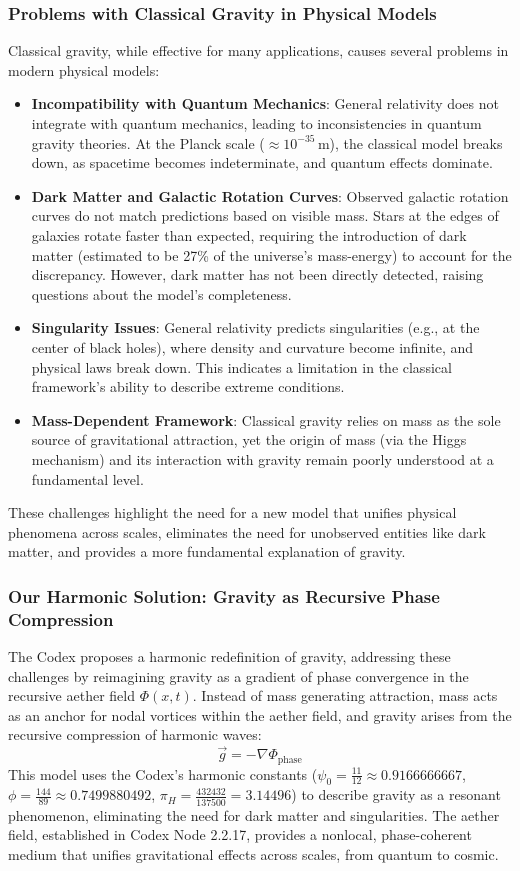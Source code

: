 \subsubsection{Problems with Classical Gravity in Physical Models}
Classical gravity, while effective for many applications, causes several problems in modern physical models:
\begin{itemize}
    \item \textbf{Incompatibility with Quantum Mechanics}: General relativity does not integrate with quantum mechanics, leading to inconsistencies in quantum gravity theories. At the Planck scale (\( \approx 10^{-35} \, \text{m} \)), the classical model breaks down, as spacetime becomes indeterminate, and quantum effects dominate.
    \item \textbf{Dark Matter and Galactic Rotation Curves}: Observed galactic rotation curves do not match predictions based on visible mass. Stars at the edges of galaxies rotate faster than expected, requiring the introduction of dark matter (estimated to be 27\% of the universe’s mass-energy) to account for the discrepancy. However, dark matter has not been directly detected, raising questions about the model’s completeness.
    \item \textbf{Singularity Issues}: General relativity predicts singularities (e.g., at the center of black holes), where density and curvature become infinite, and physical laws break down. This indicates a limitation in the classical framework’s ability to describe extreme conditions.
    \item \textbf{Mass-Dependent Framework}: Classical gravity relies on mass as the sole source of gravitational attraction, yet the origin of mass (via the Higgs mechanism) and its interaction with gravity remain poorly understood at a fundamental level.
\end{itemize}
These challenges highlight the need for a new model that unifies physical phenomena across scales, eliminates the need for unobserved entities like dark matter, and provides a more fundamental explanation of gravity.

\subsubsection{Our Harmonic Solution: Gravity as Recursive Phase Compression}
The Codex proposes a harmonic redefinition of gravity, addressing these challenges by reimagining gravity as a gradient of phase convergence in the recursive aether field \(\Phi(x, t)\). Instead of mass generating attraction, mass acts as an anchor for nodal vortices within the aether field, and gravity arises from the recursive compression of harmonic waves:
\[
\vec{g} = -\nabla \Phi_{\text{phase}}
\]
This model uses the Codex’s harmonic constants (\(\psi_0 = \frac{11}{12} \approx 0.9166666667\), \(\phi = \frac{144}{89} \approx 0.7499880492\), \(\pi_H = \frac{432432}{137500} = 3.14496\)) to describe gravity as a resonant phenomenon, eliminating the need for dark matter and singularities. The aether field, established in Codex Node 2.2.17, provides a nonlocal, phase-coherent medium that unifies gravitational effects across scales, from quantum to cosmic.

